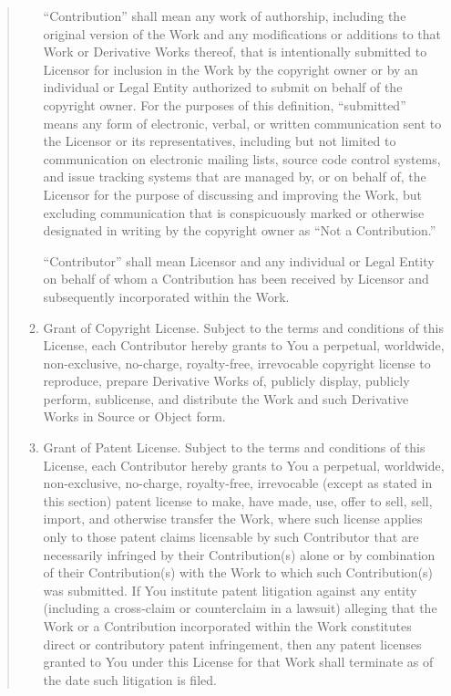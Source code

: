 \documentclass[letterpaper,10pt,english]{sphinxmanual}
\begin{document}
\begin{quote}
\begin{enumerate}
“Contribution” shall mean any work of authorship, including
the original version of the Work and any modifications or additions
to that Work or Derivative Works thereof, that is intentionally
submitted to Licensor for inclusion in the Work by the copyright owner
or by an individual or Legal Entity authorized to submit on behalf of
the copyright owner. For the purposes of this definition, “submitted”
means any form of electronic, verbal, or written communication sent
to the Licensor or its representatives, including but not limited to
communication on electronic mailing lists, source code control systems,
and issue tracking systems that are managed by, or on behalf of, the
Licensor for the purpose of discussing and improving the Work, but
excluding communication that is conspicuously marked or otherwise
designated in writing by the copyright owner as “Not a Contribution.”

“Contributor” shall mean Licensor and any individual or Legal Entity
on behalf of whom a Contribution has been received by Licensor and
subsequently incorporated within the Work.

\item {} 
Grant of Copyright License. Subject to the terms and conditions of
this License, each Contributor hereby grants to You a perpetual,
worldwide, non-exclusive, no-charge, royalty-free, irrevocable
copyright license to reproduce, prepare Derivative Works of,
publicly display, publicly perform, sublicense, and distribute the
Work and such Derivative Works in Source or Object form.

\item {} 
Grant of Patent License. Subject to the terms and conditions of
this License, each Contributor hereby grants to You a perpetual,
worldwide, non-exclusive, no-charge, royalty-free, irrevocable
(except as stated in this section) patent license to make, have made,
use, offer to sell, sell, import, and otherwise transfer the Work,
where such license applies only to those patent claims licensable
by such Contributor that are necessarily infringed by their
Contribution(s) alone or by combination of their Contribution(s)
with the Work to which such Contribution(s) was submitted. If You
institute patent litigation against any entity (including a
cross-claim or counterclaim in a lawsuit) alleging that the Work
or a Contribution incorporated within the Work constitutes direct
or contributory patent infringement, then any patent licenses
granted to You under this License for that Work shall terminate
as of the date such litigation is filed.


\end{enumerate}
\end{quote}
\end{document}

